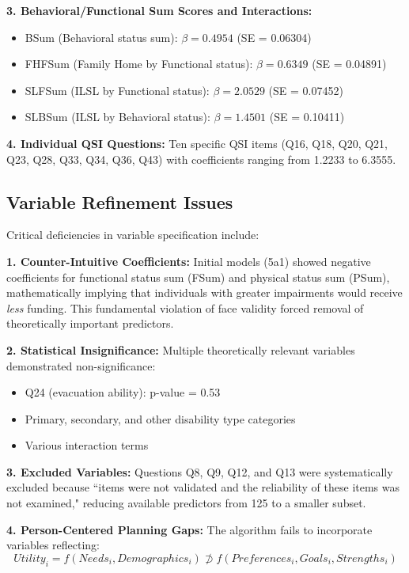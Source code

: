 \textbf{3. Behavioral/Functional Sum Scores and Interactions:}
\begin{itemize}
    \item BSum (Behavioral status sum): $\beta = 0.4954$ (SE = 0.06304)
    \item FHFSum (Family Home by Functional status): $\beta = 0.6349$ (SE = 0.04891)
    \item SLFSum (ILSL by Functional status): $\beta = 2.0529$ (SE = 0.07452)
    \item SLBSum (ILSL by Behavioral status): $\beta = 1.4501$ (SE = 0.10411)
\end{itemize}

\textbf{4. Individual QSI Questions:}
Ten specific QSI items (Q16, Q18, Q20, Q21, Q23, Q28, Q33, Q34, Q36, Q43) with coefficients ranging from 1.2233 to 6.3555.

\subsection{Variable Refinement Issues}

Critical deficiencies in variable specification include:

\textbf{1. Counter-Intuitive Coefficients:}
Initial models (5a1) showed negative coefficients for functional status sum (FSum) and physical status sum (PSum), mathematically implying that individuals with greater impairments would receive \textit{less} funding. This fundamental violation of face validity forced removal of theoretically important predictors.

\textbf{2. Statistical Insignificance:}
Multiple theoretically relevant variables demonstrated non-significance:
\begin{itemize}
    \item Q24 (evacuation ability): p-value = 0.53
    \item Primary, secondary, and other disability type categories
    \item Various interaction terms
\end{itemize}

\textbf{3. Excluded Variables:}
Questions Q8, Q9, Q12, and Q13 were systematically excluded because ``items were not validated and the reliability of these items was not examined," reducing available predictors from 125 to a smaller subset.

\textbf{4. Person-Centered Planning Gaps:}
The algorithm fails to incorporate variables reflecting:
\begin{equation}
Utility_i = f(Needs_i, Demographics_i) \not\supset f(Preferences_i, Goals_i, Strengths_i)
\end{equation}

